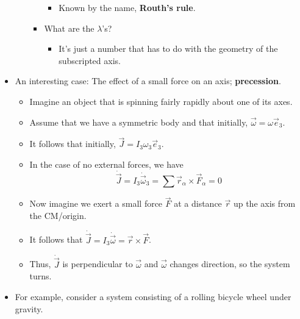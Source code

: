 \documentclass[../notes.tex]{subfiles}
\begin{document}
\begin{itemize}
\begin{enumerate}
\begin{itemize}
\begin{itemize}
                \item Known by the name, \textbf{Routh's rule}.
            \end{itemize}
            \item What are the $\lambda$'s?
            \begin{itemize}
                \item It's just a number that has to do with the geometry of the subscripted axis.
            \end{itemize}
        \end{itemize}
    \end{enumerate}
    \item An interesting case: The effect of a small force on an axis; \textbf{precession}.
    \begin{itemize}
        \item Imagine an object that is spinning fairly rapidly about one of its axes.
        \item Assume that we have a symmetric body and that initially, $\vec{\omega}=\omega\vec{e}_3$.
        \item It follows that initially, $\vec{J}=I_3\omega_3\vec{e}_3$.
        \item In the case of no external forces, we have
        \begin{equation*}
            \dot{\vec{J}} = I_3\dot{\vec{\omega}}_3
            = \sum\vec{r}_\alpha\times\vec{F}_\alpha
            = 0
        \end{equation*}
        \item Now imagine we exert a small force $\vec{F}$ at a distance $\vec{r}$ up the axis from the CM/origin.
        \item It follows that $\dot{\vec{J}}=I_3\dot{\vec{\omega}}=\vec{r}\times\vec{F}$.
        \item Thus, $\dot{\vec{J}}$ is perpendicular to $\vec{\omega}$ and $\vec{\omega}$ changes direction, so the system turns.
    \end{itemize}
    \item For example, consider a system consisting of a rolling bicycle wheel under gravity.
    \begin{figure}[h!]
        \centering
\end{figure}
\end{itemize}
\end{document}
